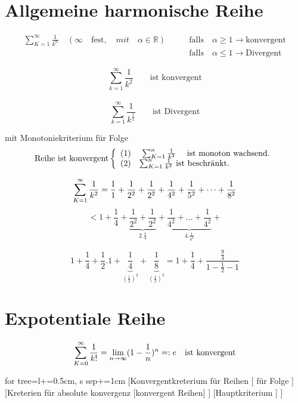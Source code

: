 \section{Allgemeine harmonische Reihe}

				\begin{equation*}
				\begin{split}
				 \sum_{K=1}^{\infty} \frac{1}{k^\alpha} \quad( \infty \quad \text{fest} ,\quad mit \quad \alpha \in \mathbb{R}) \qquad
				&\text{falls} \quad \alpha \geq 1 \rightarrow \text{konvergent}  \\
				&\text{falls} \quad \alpha \leq 1 \rightarrow \text{Divergent} 
				\end{split}
				\end{equation*}
 \begin{example}
 	\[ \sum_{k=1}^{\infty} \frac{1}{k^2} \qquad \text{ist konvergent}\]\\
 	\[ \sum_{k=1}^{\infty} \frac{1}{k^{\frac{1}{2}}} \qquad \text{ist Divergent}\]
 	
\begin{beweis}[Monotoniekriterium]
{mit Monotoniekriterium für Folge}  
		\[ \text{Reihe ist konvergent} \left\{ \begin{array}{ll}
	   (1) & \mbox{ $\sum_{K=1}^{n} \frac{1}{k^2} $ \quad ist monoton wachsend}.\\
	   (2) & \mbox{$\sum_{K=1}^{n} \frac{1}{k^2} $ \text{ist beschränkt}}.\end{array} \right. \] 
	   	
	   \[ \sum_{K=1}^{\infty} \frac{1}{k^2} = \frac{1}{1}+\frac{1}{2^2}+\frac{1}{2^2}+\frac{1}{4^2}+\frac{1}{5^2}+  \dots + \frac{1}{8^2}  \]
	   \[ <  1 + \frac{1}{4}+\underbrace{\frac{1}{2^2}+\frac{1}{2^2}}_{2. \frac{1}{4}}+\underbrace{\frac{1}{4^2}+\dots + \frac{1}{4^2}}_{4.\frac{1}{4^2}}+\]
	   
	   \[ 1+\frac{1}{4}+\frac{1}{2}.1+\underbrace{\frac{1}{4}}_{(\frac{1}{2})^2}+\underbrace{\frac{1}{8}}_{(\frac{1}{2})^3} =1+\frac{1}{4}+\frac{\frac{9}{4} }{1-\frac{1}{2}-1} \]
	   
 \end{beweis}
 \end{example}
\section{Expotentiale Reihe}

\[ \sum_{K=0}^{\infty} \frac{1}{k!} = \lim\limits_{n \rightarrow \infty} ( 1-\frac{1}{n})^n =: e \quad \text{ist konvergent} \]

	\begin{forest}
	for tree={l+=0.5cm, s sep+=1cm}
	[Konvergentkreterium für Reihen 
	[	für Folge ]
	[Kreterien für absolute konvergenz [konvergent Reihen] ]
	[Hauptkriterium ]
	]
	\end{forest}

